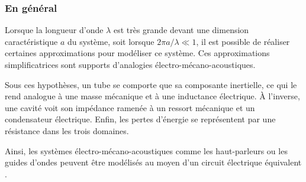 \subsubsection{En général}

Lorsque la longueur d'onde $\lambda$ est très grande devant une dimension caractéristique $a$ du système, soit lorsque $2\pi a/\lambda \ll 1$, il est possible de réaliser certaines approximations pour modéliser ce système. Ces approximations simplificatrices sont supports d'analogies électro-mécano-acoustiques. 

Sous ces hypothèses, un tube se comporte que sa composante inertielle, ce qui le rend analogue à une masse mécanique et à une inductance électrique. À l'inverse, une cavité voit son impédance ramenée à un ressort mécanique et un condensateur électrique. Enfin, les pertes d'énergie se représentent par une résistance dans les trois domaines.

Ainsi, les systèmes électro-mécano-acoustiques comme les haut-parleurs ou les guides d'ondes peuvent être modélisés au moyen d'un circuit électrique équivalent \cite{Electroac_Grains}. 
%
%    

